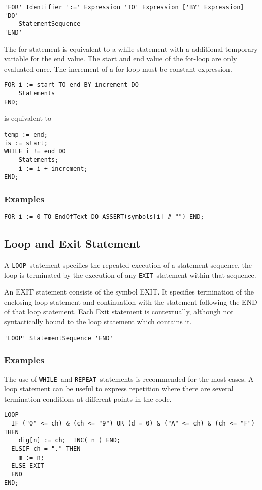 \documentclass[a4wide,11pt]{article}
\newcommand{\WHILE}{\lstinline"WHILE"}
\newcommand{\REPEAT}{\lstinline"REPEAT"}
\newcommand{\LOOP}{\lstinline"LOOP"}
\newcommand{\EXIT}{\lstinline"EXIT"}
\begin{document}
\begin{lstlisting}[style=ebnf]
'FOR' Identifier ':=' Expression 'TO' Expression ['BY' Expression] 'DO'
    StatementSequence
'END'
\end{lstlisting}

The for statement is equivalent to a while statement with a additional temporary variable for the end value.
The start and end value of the for-loop are only evaluated once.
The increment of a for-loop must be constant expression.

\begin{lstlisting}[style=example]
FOR i := start TO end BY increment DO
	Statements
END;
\end{lstlisting}
is equivalent to
\begin{lstlisting}[style=example]
temp := end;
is := start;
WHILE i != end DO
	Statements;
	i := i + increment;
END;
\end{lstlisting}

\begin{annotation}
\subsubsection{Examples}
\begin{lstlisting}[style=example]
FOR i := 0 TO EndOfText DO ASSERT(symbols[i] # "") END;
\end{lstlisting}
\end{annotation}

\subsection{Loop and Exit Statement}
A \LOOP\ statement specifies the repeated execution of a statement sequence, the loop is terminated by the execution of any \EXIT\ statement within that sequence.



An EXIT statement consists of the symbol EXIT.
It specifies termination of the enclosing loop statement and continuation with the statement following the END of that loop statement.
Each Exit statement is contextually, although not syntactically bound to the loop statement which contains it.

\begin{lstlisting}[style=ebnf]
'LOOP' StatementSequence 'END'
\end{lstlisting}

\begin{annotation}
\subsubsection{Examples}
The use of \WHILE\ and \REPEAT\ statements is recommended for the most cases.
A loop statement can be useful to express repetition where there are several termination conditions at different points in the code.

\begin{lstlisting}[style=example]
LOOP
  IF ("0" <= ch) & (ch <= "9") OR (d = 0) & ("A" <= ch) & (ch <= "F") THEN
    dig[n] := ch;  INC( n ) END;
  ELSIF ch = "." THEN
  	m := n;
  ELSE EXIT
  END
END;
\end{lstlisting}
\end{annotation}
\end{document}
